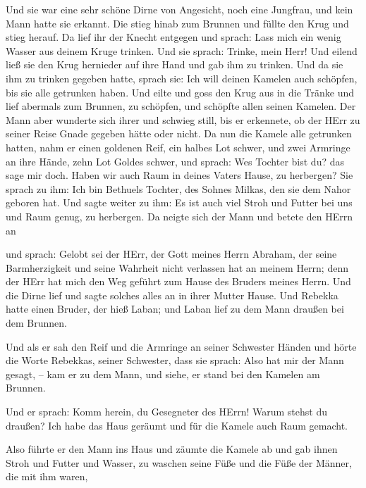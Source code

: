 Und sie war eine sehr schöne Dirne von Angesicht, noch eine Jungfrau,
und kein Mann hatte sie erkannt. Die stieg hinab zum Brunnen und füllte
den Krug und stieg herauf.  Da lief ihr der Knecht entgegen
und sprach: Lass mich ein wenig Wasser aus deinem Kruge trinken.
 Und sie sprach: Trinke, mein Herr! Und eilend ließ sie den
Krug hernieder auf ihre Hand und gab ihm zu trinken.  Und
da sie ihm zu trinken gegeben hatte, sprach sie: Ich will deinen Kamelen
auch schöpfen, bis sie alle getrunken haben.  Und eilte und
goss den Krug aus in die Tränke und lief abermals zum Brunnen, zu
schöpfen, und schöpfte allen seinen Kamelen.  Der Mann aber
wunderte sich ihrer und schwieg still, bis er erkennete, ob der HErr zu
seiner Reise Gnade gegeben hätte oder nicht.  Da nun die
Kamele alle getrunken hatten, nahm er einen goldenen Reif, ein halbes
Lot schwer, und zwei Armringe an ihre Hände, zehn Lot Goldes schwer,
 und sprach: Wes Tochter bist du? das sage mir doch. Haben
wir auch Raum in deines Vaters Hause, zu herbergen?  Sie
sprach zu ihm: Ich bin Bethuels Tochter, des Sohnes Milkas, den sie dem
Nahor geboren hat.  Und sagte weiter zu ihm: Es ist auch
viel Stroh und Futter bei uns und Raum genug, zu herbergen.
 Da neigte sich der Mann und betete den HErrn an

 und sprach: Gelobt sei der HErr, der Gott meines Herrn
Abraham, der seine Barmherzigkeit und seine Wahrheit nicht verlassen hat
an meinem Herrn; denn der HErr hat mich den Weg geführt zum Hause des
Bruders meines Herrn.  Und die Dirne lief und sagte solches
alles an in ihrer Mutter Hause.  Und Rebekka hatte einen
Bruder, der hieß Laban; und Laban lief zu dem Mann draußen bei dem
Brunnen.

 Und als er sah den Reif und die Armringe an seiner
Schwester Händen und hörte die Worte Rebekkas, seiner Schwester, dass
sie sprach: Also hat mir der Mann gesagt, -- kam er zu dem Mann, und
siehe, er stand bei den Kamelen am Brunnen.

 Und er sprach: Komm herein, du Gesegneter des HErrn! Warum
stehst du draußen? Ich habe das Haus geräumt und für die Kamele auch
Raum gemacht.

 Also führte er den Mann ins Haus und zäumte die Kamele ab
und gab ihnen Stroh und Futter und Wasser, zu waschen seine Füße und die
Füße der Männer, die mit ihm waren,

